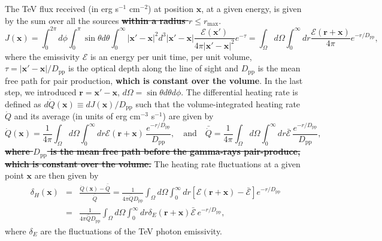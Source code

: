 \documentclass[numberedappendix]{emulateapj}
\newcommand\ALc[1]{{\color{red} \bf #1}} %
\newcommand\Pc[1]{{\color{cyan} \bf #1}} %
\begin{document}
The TeV flux received (in erg s$^{-1}$ cm$^{-2}$) at position $\mathbf{x}$, at a given energy, is given by the sum over all the sources \ALc{\sout{within a radius $r\leqslant r_{\mathrm{max}}$}}.
\begin{equation}
  \label{eq:flux_recu0}
  J(\mathbf{x})=
  \int_{0}^{2\pi}d\phi\int_{0}^{\pi}\sin\theta d\theta\int_0^{\infty}|\mathbf{x}'-\mathbf{x}|^2 d^3|\mathbf{x}'-\mathbf{x}|
  \frac{\mathcal{E}(\mathbf{x}') }{4\pi |\mathbf{x}'-\mathbf{x}|^2} e^{-\tau}
  =\int_{\Omega} d\Omega\int_0^{\infty} dr \frac{\mathcal{E}(\mathbf{r}+\mathbf{x}) }{4\pi } e^{- r/D_{\mathrm{pp}}},
\end{equation}
where the emissivity $\mathcal{E}$ is an energy per unit time, per unit volume, $\tau=|\mathbf{x}'-\mathbf{x}|/D_{\mathrm{pp}}$ is the optical depth along the line of sight and $D_{\mathrm{pp}}$ is the mean free path for pair production, \ALc{which is constant over the volume}. In the last step, we introduced $\mathbf{r}=\mathbf{x}'-\mathbf{x}$, $d\Omega=\sin\theta d\theta d\phi$. The differential heating rate is defined as $d\dot{Q}(\mathbf{x})\equiv dJ(\mathbf{x})/D_{\mathrm{pp}}$ such that the volume-integrated heating rate $\dot{Q}$ and its average (in units of erg cm$^{-3}$ s$^{-1}$) are given by 
\begin{equation}
  \label{eq:heating_rate0}
  \dot{Q}(\mathbf{x})=
  \frac{1}{4\pi}   \int_{\Omega}d\Omega\int_0^{\infty} dr \mathcal{E}(\mathbf{r}+\mathbf{x})\, \frac{e^{-r/D_{\mathrm{pp}}}}{D_{\mathrm{pp}}},\quad\mbox{and}\quad
  \bar{\dot{Q}}= \frac{1}{4\pi}   \int_{\Omega}d\Omega\int_0^{\infty} dr \bar{\mathcal{E}} \,\frac{e^{-r/D_{\mathrm{pp}}}}{D_{\mathrm{pp}}} ,
\end{equation}
\ALc{\sout{where $D_{\mathrm{pp}}$ is the mean free path before the gamma-rays pair-produce, which is constant over the volume.}}
The heating rate fluctuations at a given point $\mathbf{x}$ are then given by 
\begin{eqnarray}
  \label{eq:heat_fluc_newt0}
  \delta_H(\mathbf{x})&=&\frac{\dot{Q}(\mathbf{x})-\bar{\dot{Q}}}{\bar{\dot{Q}}}=
  \frac{1}{4\pi\bar{\dot{Q}}D_{\mathrm{pp}}} \int_{\Omega}d\Omega\int_0^{\infty} dr 
  [\mathcal{E}(\mathbf{r}+\mathbf{x})-\bar{\mathcal{E}}]e^{-r/D_{\mathrm{pp}}} \nonumber\\
  &=&\frac{1}{4\pi\bar{\dot{Q}}D_{\mathrm{pp}}}\int_{\Omega}d\Omega\int_0^{\infty} dr \delta_E(\mathbf{r}+\mathbf{x})\bar{\mathcal{E}}\,e^{-r/D_{\mathrm{pp}}} ,
\end{eqnarray}
where $\delta_E$ are the fluctuations of the TeV photon emissivity. %
\end{document}
